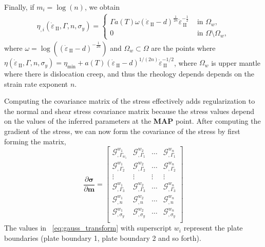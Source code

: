 \documentclass[12pt]{article}
\newcommand{\vrnote}[1]{\textcolor{red}{VR: #1}}
\newcommand{\IIinv}{{\dot\varepsilon}_{\mathrm{\!\!\:II}}}
\newcommand{\mm}{{\ensuremath{\boldsymbol{m}}}}
\newcommand{\ssigma}{{\ensuremath{\boldsymbol{\sigma}}}}
\begin{document}
Finally, if $m_i = \log(n)$, we obtain
\begin{align*}
  \eta_{,i}(\IIinv,\Gamma,n,\sigma_y) =
  \begin{cases}
    \Gamma a(T)\omega(\IIinv-d)^{\frac{1}{2n}}\IIinv^{-\frac{1}{2}} &
    \text{ in }\Omega_w,\\
    0 & \text{ in } \Omega\setminus\Omega_w,
  \end{cases}
  \end{align*}
where $\omega = \log((\IIinv-d)^{-\frac{1}{2n}})$ and
$\Omega_w\subset\Omega$ are the points where
$\eta(\IIinv,\Gamma,n,\sigma_y) = \eta_{\min} +
a(T)(\IIinv-d)^{1/(2n)}\IIinv^{-1/2}$, where $\Omega_w$ is upper mantle where there is dislocation creep, and thus the rheology depends depends
on the strain rate exponent $n$.

Computing the covariance matrix of the stress effectively adds regularization to the normal and shear stress covariance matrix because the stress values depend on the values of the inferred parameters at the \textbf{MAP} point. After computing the gradient of the stress, we can now form the covariance of the stress by first forming the matrix,
\begin{equation}
\frac{\partial \ssigma}{\partial \mm}=
  \begin{bmatrix}
    \mathcal G^{w_1}_{,\Gamma_{w_1}}  & \mathcal G^{w_2}_{,\Gamma_{1}} & \hdots & \mathcal G^{w_n}_{,\Gamma_{1}} \\
    \mathcal G^{w_1}_{,\Gamma_{2}} & \mathcal G^{w_2}_{,\Gamma_{2}}  &  \hdots & \mathcal G^{w_n}_{,\Gamma_{2}} \\
    \vdots & \vdots & \vdots & \vdots  \\
    \mathcal G^{w_1}_{,\Gamma_{3}} & \mathcal G^{w_2}_{,\Gamma_{3}} &   \hdots & \mathcal G^{w_n}_{,\Gamma_{3}} \\
    \mathcal G^{w_1}_{,n} & \mathcal G^{w_2}_{,n} &  \hdots & \mathcal G^{w_n}_{,n} \\
    \mathcal G^{w_1}_{,\sigma_y} & \mathcal G^{w_2}_{,\sigma_y} &  \hdots & \mathcal G^{w_n}_{,\sigma_y} \\

\end{bmatrix}
\label{eq:gauss_transform}
\end{equation}
The values in ~\eqref{eq:gauss_transform} with superscript $w_i$ represent the  plate boundaries (plate boundary 1, plate boundary 2 and so forth).
\end{document}

